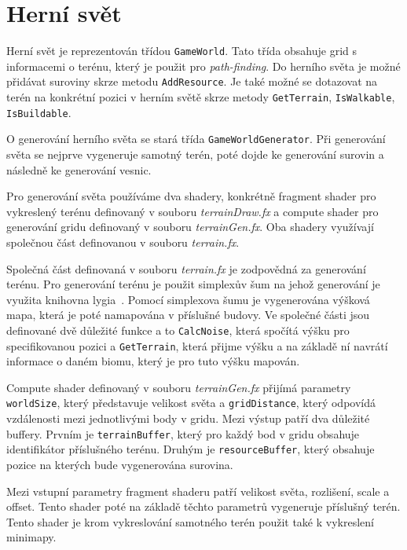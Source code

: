 
\section{Herní svět}
Herní svět je reprezentován třídou \verb|GameWorld|. Tato třída obsahuje grid s informacemi o terénu, který je použit pro \textit{path-finding}. Do herního světa je možné přidávat suroviny skrze metodu \verb|AddResource|. Je také možné se dotazovat na terén na konkrétní pozici v herním světě skrze metody \verb|GetTerrain|, \verb|IsWalkable|, \verb|IsBuildable|.

O generování herního světa se stará třída \verb|GameWorldGenerator|. Při generování světa se nejprve vygeneruje samotný terén, poté dojde ke generování surovin a následně ke generování vesnic.

Pro generování světa používáme dva shadery, konkrétně fragment shader pro vykreslený terénu definovaný v souboru \textit{terrainDraw.fx} a compute shader pro generování gridu definovaný v souboru \textit{terrainGen.fx}. Oba shadery využívají společnou část definovanou v souboru \textit{terrain.fx}.

Společná část definovaná v souboru \textit{terrain.fx} je zodpovědná za generování terénu. Pro generování terénu je použit simplexův šum na jehož generování je využita knihovna lygia~\cite{lygia}. Pomocí simplexova šumu je vygenerována výšková mapa, která je poté namapována v příslušné budovy. Ve společné části jsou definované dvě důležité funkce a to \verb|CalcNoise|, která spočítá výšku pro specifikovanou pozici a \verb|GetTerrain|, která přijme výšku a na základě ní navrátí informace o daném biomu, který je pro tuto výšku mapován.

Compute shader definovaný v souboru \textit{terrainGen.fx} přijímá parametry \verb|worldSize|, který představuje velikost světa a \verb|gridDistance|, který odpovídá vzdálenosti mezi jednotlivými body v gridu. Mezi výstup patří dva důležité buffery. Prvním je \verb|terrainBuffer|, který pro každý bod v gridu obsahuje identifikátor příslušného terénu. Druhým je \verb|resourceBuffer|, který obsahuje pozice na kterých bude vygenerována surovina.

Mezi vstupní parametry fragment shaderu patří velikost světa, rozlišení, scale a offset. Tento shader poté na základě těchto parametrů vygeneruje příslušný terén. Tento shader je krom vykreslování samotného terén použit také k vykreslení minimapy.

